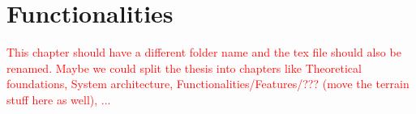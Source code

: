 \chapter{Functionalities}
\textcolor{red}{This chapter should have a different folder name and the tex file should also be renamed.
    Maybe we could split the thesis into chapters like Theoretical foundations, System architecture, Functionalities/Features/??? (move the terrain stuff here as well), ...}

